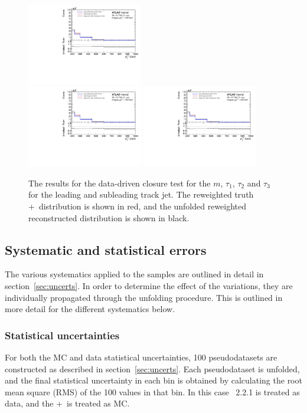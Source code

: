 \begin{figure}[h!]
  \includegraphics[page=651,width=0.45\textwidth]{figures/IBUClosureTests.pdf} \\
  \includegraphics[page=615,width=0.45\textwidth]{figures/IBUClosureTests.pdf}
  \includegraphics[page=657,width=0.45\textwidth]{figures/IBUClosureTests.pdf}
  \caption{The results for the data-driven closure test for the $m$, $\tau_1$, $\tau_2$ and $\tau_3$ for the leading and subleading track jet. The reweighted truth \powheg+\pythia~distribution is shown in red, and the unfolded reweighted reconstructed distribution is shown in black.}
  \label{fig:DDTestTJ2}
\end{figure}

\clearpage

\subsection{Systematic and statistical errors}
The various systematics applied to the samples are outlined in detail in section~\ref{sec:uncerts}. In order to determine the effect of the variations, they are individually propagated through the unfolding procedure. This is outlined in more detail for the different systematics below.
\subsubsection{Statistical uncertainties}
For both the MC and data statistical uncertainties, 100 pseudodatasets are constructed as described in section~\ref{sec:uncerts}. Each pseudodataset is unfolded, and the final statistical uncertainty in each bin is obtained by calculating the root mean square (RMS) of the 100 values in that bin. In this case \sherpa~2.2.1 is treated as data, and the \powheg+\pythia~is treated as MC.

